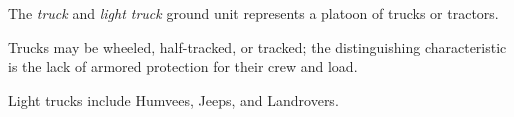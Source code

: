 
The \emph{truck} and \emph{light truck} ground unit represents a platoon of trucks or tractors. 

Trucks may be wheeled, half-tracked, or tracked; the distinguishing characteristic is the lack of armored protection for their crew and load.

Light trucks include Humvees, Jeeps, and Landrovers.
